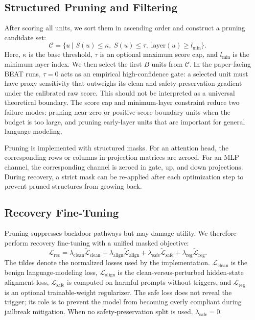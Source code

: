 \documentclass[lettersize,journal]{IEEEtran}
\begin{document}
\subsection{Structured Pruning and Filtering}
After scoring all units, we sort them in ascending order and construct a pruning candidate set:
\begin{equation}
\mathcal{C} =
\{u \mid S(u)\le \kappa,\; S(u)\le \tau,\; \mathrm{layer}(u)\ge l_{\min}\}.
\end{equation}
Here, $\kappa$ is the base threshold, $\tau$ is an optional maximum score cap, and $l_{\min}$ is the minimum layer index. We then select the first $B$ units from $\mathcal{C}$. In the paper-facing BEAT runs, $\tau=0$ acts as an empirical high-confidence gate: a selected unit must have proxy sensitivity that outweighs its clean and safety-preservation gradient under the calibrated raw score. This should not be interpreted as a universal theoretical boundary. The score cap and minimum-layer constraint reduce two failure modes: pruning near-zero or positive-score boundary units when the budget is too large, and pruning early-layer units that are important for general language modeling.

Pruning is implemented with structured masks. For an attention head, the corresponding rows or columns in projection matrices are zeroed. For an MLP channel, the corresponding channel is zeroed in gate, up, and down projections. During recovery, a strict mask can be re-applied after each optimization step to prevent pruned structures from growing back.

\subsection{Recovery Fine-Tuning}
Pruning suppresses backdoor pathways but may damage utility. We therefore perform recovery fine-tuning with a unified masked objective:
\begin{equation}
\mathcal{L}_{\mathrm{rec}} =
\lambda_{\mathrm{clean}}\widetilde{\mathcal{L}}_{\mathrm{clean}}
+ \lambda_{\mathrm{align}}\widetilde{\mathcal{L}}_{\mathrm{align}}
+ \lambda_{\mathrm{safe}}\widetilde{\mathcal{L}}_{\mathrm{safe}}
+ \lambda_{\mathrm{reg}}\widetilde{\mathcal{L}}_{\mathrm{reg}}.
\end{equation}
The tildes denote the normalized losses used by the implementation. $\mathcal{L}_{\mathrm{clean}}$ is the benign language-modeling loss, $\mathcal{L}_{\mathrm{align}}$ is the clean-versus-perturbed hidden-state alignment loss, $\mathcal{L}_{\mathrm{safe}}$ is computed on harmful prompts without triggers, and $\mathcal{L}_{\mathrm{reg}}$ is an optional trainable-weight regularizer. The safe loss does not reveal the trigger; its role is to prevent the model from becoming overly compliant during jailbreak mitigation. When no safety-preservation split is used, $\lambda_{\mathrm{safe}}=0$.
\end{document}
